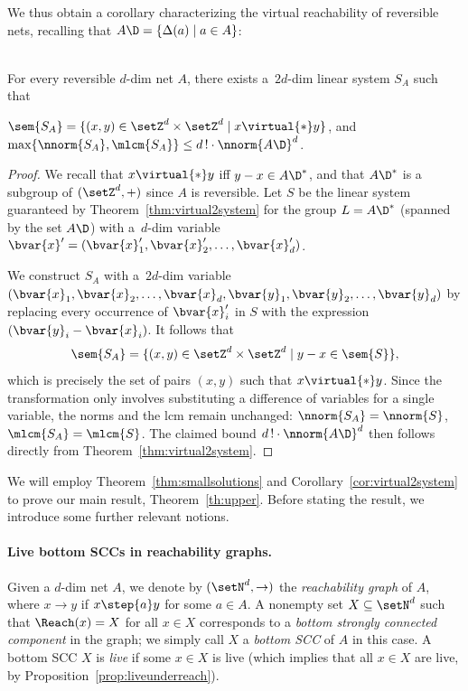 \noindent
We thus obtain a corollary characterizing the virtual reachability of
reversible nets, recalling that $A\D=\{\Delta(a)\mid a\in A\}$: 
\begin{cor}\label{cor:virtual2system}
\hfill\\
	For every reversible $d$-dim net $A$, there exists
	a~$2d$-dim linear system $S_A$ such that
		\begin{center}
		$\sem{S_A}=\{(x,y)\in\setZ^d\times\setZ^d \mid
			x\virtual{*} y\}$, and
	$\max\{\nnorm{S_A},\mlcm{S_A}\}\leq d\,!\cdot\nnorm{A\D}^d$.
\end{center}
\end{cor}
\begin{proof}
	We recall that $x\virtual{*} y$ iff $y-x\in A\D^*$, and that 
	$A\D^*$ is a subgroup of $(\setZ^d,+)$ since $A$ is
reversible.
	Let $S$ be the linear system guaranteed 
	by 
	Theorem~\ref{thm:virtual2system} for the group $L=A\D^*$
	(spanned by the set $A\D$)
	 with a~$d$-dim variable
	 $\bvar{x}'=(\bvar{x}'_1,\bvar{x}'_2,\dots,\bvar{x}'_d)$.

	We construct $S_A$ with a~$2d$-dim variable 
	$(\bvar{x}_1,\bvar{x}_2,\dots,\bvar{x}_d,\bvar{y}_1,\bvar{y}_2,\dots,\bvar{y}_d)$ 
	 by replacing every occurrence of
	$\bvar{x}'_i$ in $S$ with the expression
	$(\bvar{y}_i-\bvar{x}_i)$. It follows that 
	\[\sem{S_A}=\{(x,y)\in\setZ^d\times\setZ^d\mid
	y-x\in\sem{S}\},\]
	which is precisely the set of pairs $(x,y)$ such that $x\virtual{*} y$.
Since the transformation only involves substituting a difference of
	variables for a single variable, the norms and the lcm remain
	unchanged: $\nnorm{S_A}=\nnorm{S}$, $\mlcm{S_A}=\mlcm{S}$.
 The claimed bound $d\,!\cdot\nnorm{A\D}^d$
then follows directly from
	Theorem~\ref{thm:virtual2system}.
\end{proof}
\noindent
We will employ Theorem~\ref{thm:smallsolutions} and
Corollary~\ref{cor:virtual2system} to prove our main result,
Theorem~\ref{th:upper}. Before stating the result, we introduce
some further relevant notions.

\paragraph{Live bottom SCCs in reachability graphs.}
Given a $d$-dim net $A$, we denote by $(\setN^d,\to)$ 
the \emph{reachability graph} of
$A$, where $x\to y$ if $x\step{a}y$
for some $a\in A$. A nonempty set $X\subseteq \setN^d$ such that
$\Reach(x)=X$ for all $x\in X$ corresponds to 
 a \emph{bottom strongly connected component}  
in the graph; we simply call $X$ a \emph{bottom SCC} of $A$ in this case. 
A bottom SCC $X$ is \emph{live} if some $x\in X$ is live (which
implies that all $x\in X$ are live, by
Proposition~\ref{prop:liveunderreach}).

